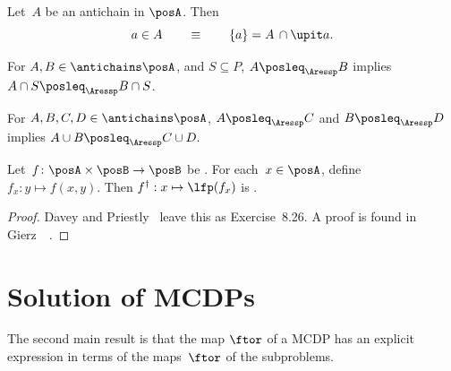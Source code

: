 \begin{lem}
\label{lem:antichain-write}Let~$A$ be an antichain in $\posA$.
Then
\[
a\in A\qquad\equiv\qquad\{a\}=A\,\cap\upit a.
\]
\end{lem}

\begin{lem}
\label{lem:antichain_inter}For $A,B\in\antichains\posA$, and $S\subseteq P$,
$A\posleq_{\Aressp}B$ implies $A\cap S\posleq_{\Aressp}B\cap S$. 
\end{lem}

\begin{lem}
\label{lem:antichain_union}For $A,B,C,D\in\antichains\posA$, $A\posleq_{\Aressp}C$
and $B\posleq_{\Aressp}D$ implies $A\cup B\posleq_{\Aressp}C\cup D.$
\end{lem}

\begin{lem}
\label{lem:dagger}Let~$f\colon\posA\times\posB\rightarrow\posB$
be \scottcontinuous. For each~$x\in\posA$, define $f_{x}:y\mapsto f(x,y).$
Then $f^{\dagger}:x\mapsto\lfp(f_{x})$ is \scottcontinuous.
\end{lem}
\begin{proof}
Davey and Priestly~\cite{davey02} leave this as Exercise~8.26.
A proof is found in Gierz~\etal~\cite[Exercise II-2.29]{gierz03continuous}.
\end{proof}




\section{Solution of MCDPs\label{sec:Solution-of-Monotone}}

The second main result is that the map $\ftor$ of a MCDP has an explicit
expression in terms of the maps~$\ftor$ of the subproblems.  

\noindent 
{}

